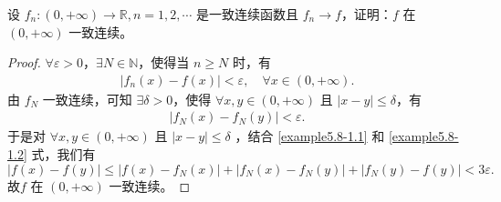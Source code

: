 \documentclass[lang=cn,newtx,10pt,scheme=chinese]{elegantbook}
\begin{document}
\begin{example}
设 \( f_n : (0, +\infty) \to \mathbb{R}, n = 1, 2, \cdots \) 是一致连续函数且 \( f_n \rightarrow f \)，证明：\( f \) 在 \( (0, +\infty) \) 一致连续。
\end{example}
\begin{proof}
$\forall \varepsilon > 0$，$\exists N \in \mathbb{N}$，使得当 $n \geqslant N$ 时，有
\begin{align}
\left| f_n\left( x \right) - f\left( x \right) \right| < \varepsilon, \quad \forall x \in \left( 0, +\infty \right). \label{example5.8-1.1}
\end{align}
由 $f_N$ 一致连续，可知 $\exists \delta > 0$，使得 $\forall x, y \in \left( 0, +\infty \right)$ 且 $\left| x - y \right| \leqslant \delta$，有
\begin{align}
\left| f_N\left( x \right) - f_N\left( y \right) \right| < \varepsilon. \label{example5.8-1.2}
\end{align}
于是对 $\forall x, y \in \left( 0, +\infty \right)$ 且 $\left| x - y \right| \leqslant \delta$ ，结合 \eqref{example5.8-1.1} 和 \eqref{example5.8-1.2} 式，我们有
\[
\left| f\left( x \right) - f\left( y \right) \right| \leqslant \left| f\left( x \right) - f_N\left( x \right) \right| + \left| f_N\left( x \right) - f_N\left( y \right) \right| + \left| f_N\left( y \right) - f\left( y \right) \right| < 3\varepsilon.
\]
故\( f \) 在 \( (0, +\infty) \) 一致连续。
\end{proof}
\end{document}
